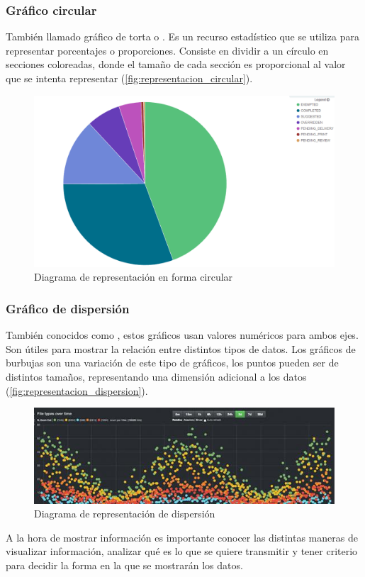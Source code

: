 \subsubsection*{Gráfico circular}
También llamado gráfico de torta o . Es un recurso estadístico
que se utiliza para representar porcentajes o proporciones. Consiste en dividir
a un círculo en secciones coloreadas, donde el tamaño de cada sección es
proporcional al valor que se intenta representar
(\autoref{fig:representacion_circular}).

\begin{figure}
  \includegraphics[width=\linewidth]{src/images/01-capitulo-1/representacion_circular.png}
  \caption{Diagrama de representación en forma circular}
  \label{fig:representacion_circular}
\end{figure}

\subsubsection*{Gráfico de dispersión}
También conocidos como , estos gráficos usan valores
numéricos para ambos ejes. Son útiles para mostrar la relación entre distintos
tipos de datos. Los gráficos de burbujas son una variación de este tipo de
gráficos, los puntos pueden ser de distintos tamaños, representando una
dimensión adicional a los datos (\autoref{fig:representacion_dispersion}).

\begin{figure}
  \includegraphics[width=\linewidth]{src/images/01-capitulo-1/representacion_dispersion.jpg}
  \caption{Diagrama de representación de dispersión}
  \label{fig:representacion_dispersion}
\end{figure}

A la hora de mostrar información es importante conocer las distintas maneras de
visualizar información, analizar qué es lo que se quiere transmitir y tener
criterio para decidir la forma en la que se mostrarán los datos.

